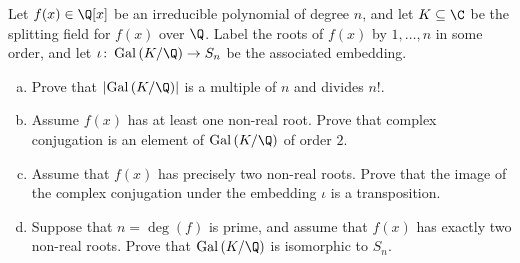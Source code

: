 \documentclass[10pt]{mypackage}
\begin{document}
\begin{problem}[Problem 4]
  Let $f(x)\in \Q[x]$ be an irreducible polynomial of degree $n$, and let $K\subseteq \C$ be the splitting field for $f(x)$ over $\Q$. Label the roots of $f(x)$ by $1,\dots,n$ in some order, and let $\iota\colon \operatorname{Gal}\left( K/\Q \right)\rightarrow S_n$ be the associated embedding.
  \begin{enumerate}[(a)]
    \item Prove that $\left\vert \operatorname{Gal}\left( K/\Q \right) \right\vert$ is a multiple of $n$ and divides $n!$.
    \item Assume $f(x)$ has at least one non-real root. Prove that complex conjugation is an element of $ \operatorname{Gal}\left( K/\Q \right) $ of order $2$.
    \item Assume that $f(x)$ has precisely two non-real roots. Prove that the image of the complex conjugation under the embedding $\iota$ is a transposition.
    \item Suppose that $n = \operatorname{deg}\left( f \right)$ is prime, and assume that $f(x)$ has exactly two non-real roots. Prove that $\operatorname{Gal}\left( K/\Q \right)$ is isomorphic to $S_n$.
  \end{enumerate}
\end{problem}
\end{document}
